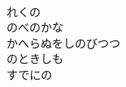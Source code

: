\documentclass[10pt,b5j]{tarticle} %
\begin{document}
\begin{enumerate}
\begin{minipage}[c]{\blocksize}
    \end{minipage}
    \begin{minipage}[c]{\blocksize}
        
        \vspace{\linespace}
        \item~\\
        れくの\\
        のべのかな\\
        かへらぬをしのびつつ\\
        のときしも\\
        すでにの
    
    \end{minipage}
\end{enumerate} %
\end{document}

